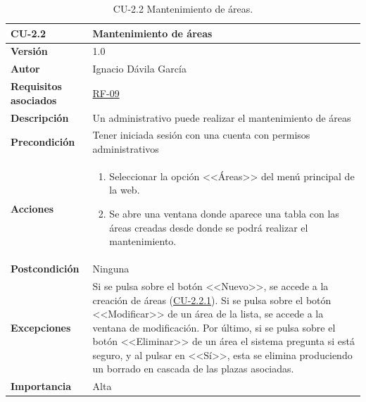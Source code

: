 \begin{table}[p]
\label{table:CU-2.2}
	\centering
	\begin{tabularx}{\linewidth}{ p{} p{} }
		\toprule
		\textbf{CU-2.2}    & \textbf{Mantenimiento de áreas}\\
		\toprule
		\textbf{Versión}              & 1.0    \\
		\textbf{Autor}                & Ignacio Dávila García \\
		\textbf{Requisitos asociados} & \hyperref[itm:RF9]{RF-09} \\
		\textbf{Descripción}          & Un administrativo puede realizar el mantenimiento de áreas \\
		\textbf{Precondición}         & Tener iniciada sesión con una cuenta con permisos administrativos \\
		\textbf{Acciones}             &
		\begin{enumerate}
			\def\labelenumi{\arabic{enumi}.}
			\tightlist
			\item Seleccionar la opción <<Áreas>> del menú principal de la web.
			\item Se abre una ventana donde aparece una tabla con las áreas creadas desde donde se podrá realizar el mantenimiento.
		\end{enumerate}\\
		\textbf{Postcondición}        & Ninguna \\
		\textbf{Excepciones}          & Si se pulsa sobre el botón <<Nuevo>>, se accede a la creación de áreas (\hyperref[table:CU-2.2.1]{CU-2.2.1}). Si se pulsa sobre el botón <<Modificar>> de un área de la lista, se accede a la ventana de modificación. Por último, si se pulsa sobre el botón <<Eliminar>> de un área el sistema pregunta si está seguro, y al pulsar en <<Sí>>, esta se elimina produciendo un borrado en cascada de las plazas asociadas. \\
		\textbf{Importancia}          & Alta \\
		\bottomrule
	\end{tabularx}
	\caption{CU-2.2 Mantenimiento de áreas.}
\end{table}
\FloatBarrier

